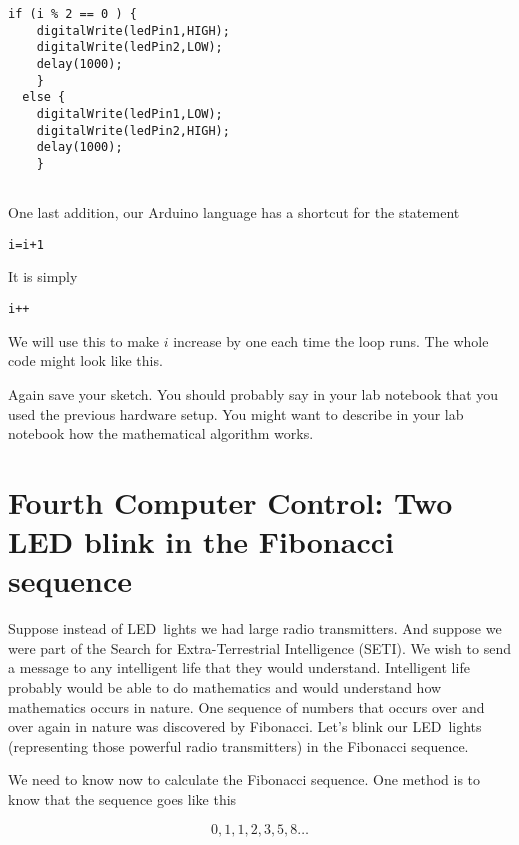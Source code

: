  \begin{lstlisting}[language=Arduino]
  if (i % 2 == 0 ) {
    digitalWrite(ledPin1,HIGH);
    digitalWrite(ledPin2,LOW);
    delay(1000);
    }
  else {
    digitalWrite(ledPin1,LOW);
    digitalWrite(ledPin2,HIGH);
    delay(1000);
    }
 
 \end{lstlisting}

One last addition, our Arduino language has a shortcut for the statement

\begin{lstlisting}[language=Arduino]
  i=i+1
\end{lstlisting}

It is simply

\begin{lstlisting}[language=Arduino]
  i++
\end{lstlisting}

We will use this to make $i$ increase by one each time the loop runs. The whole code might look like this.



Again save your sketch. You should probably say in your lab notebook that
you used the previous hardware setup. You might want to describe in your lab
notebook how the mathematical algorithm works.

\section{Fourth Computer Control: Two LED blink in the Fibonacci sequence}

Suppose instead of LED\ lights we had large radio transmitters. And suppose
we were part of the Search for Extra-Terrestrial Intelligence (SETI). We
wish to send a message to any intelligent life that they would understand.
Intelligent life probably would be able to do mathematics and would
understand how mathematics occurs in nature. One sequence of numbers that
occurs over and over again in nature was discovered by Fibonacci. Let's
blink our LED\ lights (representing those powerful radio transmitters) in
the Fibonacci sequence.

We need to know now to calculate the Fibonacci sequence. One method is to
know that the sequence goes like this

\begin{equation*}
	0,1,1,2,3,5,8\ldots
\end{equation*}

